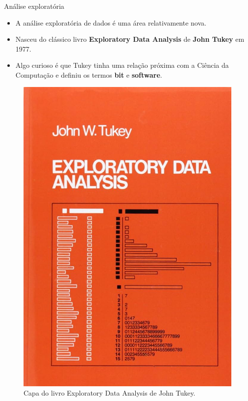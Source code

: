 \documentclass[
  ignorenonframetext,
  serif,
  professionalfont,
  usenames,
  dvipsnames,
  aspectratio = 169]{beamer}
\providecommand{\tightlist}{%
  \setlength{\itemsep}{0pt}\setlength{\parskip}{0pt}}
\renewcommand{\tightlist}{%
  \setlength{\itemsep}{0\baselineskip}
  \setlength{\parskip}{0.25\baselineskip}
}
\def\beginAHalfColumn{\begin{minipage}{0.49\textwidth}}%
\def\endColumns{\end{minipage}}%
\begin{document}
\begin{frame}{Análise exploratória}
\label{anuxe1lise-exploratuxf3ria-2}
\beginAHalfColumn

\begin{itemize}
\tightlist
\item
  A análise exploratória de dados é uma área relativamente nova.
\end{itemize}

\vspace{0.3cm}

\begin{itemize}
\tightlist
\item
  Nasceu do clássico livro \textbf{Exploratory Data Analysis} de
  \textbf{John Tukey} em 1977.
\end{itemize}

\vspace{0.3cm}

\begin{itemize}
\tightlist
\item
  Algo curioso é que Tukey tinha uma relação próxima com a Ciência da
  Computação e definiu os termos \textbf{bit} e \textbf{software}.
\end{itemize}

\endColumns
\beginAHalfColumn

\begin{figure}

{\centering \includegraphics[width=0.62\linewidth]{./img/eda-tukey} 

}

\caption{Capa do livro Exploratory Data Analysis de John Tukey.}\label{fig:unnamed-chunk-30}
\end{figure}

\endColumns
\end{frame}
\end{document}
